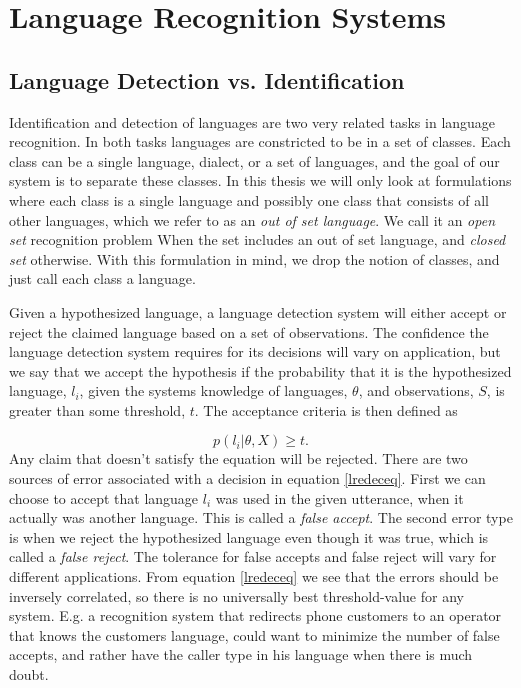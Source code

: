 \chapter{Language Recognition Systems}

\section{Language Detection vs. Identification}
\label{sect:detvsid}

Identification and detection of languages are two very related tasks in language recognition. In both tasks languages are constricted to be in a set of classes. Each class can be a single language, dialect, or a set of languages, and the goal of our system is to separate these classes. In this thesis we will only look at formulations where each class is a single language and possibly one class that consists of all other languages, which we refer to as an \emph{out of set language}. We call it an \emph{open set} recognition problem When the set includes an out of set language, and \emph{closed set} otherwise. With this formulation in mind, we drop the notion of classes, and just call each class a language. 

Given a hypothesized language, a language detection system will either accept or reject the claimed language based on a set of observations. The confidence the language detection system requires for its decisions will vary on application, but we say that we accept the hypothesis if the probability that it is the hypothesized language, $l_i$, given the systems knowledge of languages, $\theta$, and observations, $S$, is greater than some threshold, $t$. The acceptance criteria is then defined as

\begin{equation}
\label{lredeceq}
p(l_i | \theta, X) \geq t.
\end{equation}
Any claim that doesn't satisfy the equation will be rejected. There are two sources of error associated with a decision in equation \ref{lredeceq}. First we can choose to accept that language $l_i$ was used in the given utterance, when it actually was another language. This is called a \emph{false accept}. The second error type is when we reject the hypothesized language even though it  was true, which is called a  \emph{false reject}. The tolerance for false accepts and false reject will vary for different applications. From equation \ref{lredeceq} we see that the errors should be inversely correlated, so there is no universally best threshold-value for any system. E.g. a recognition system that redirects phone customers to an operator that knows the customers language, could want to minimize the number of false accepts, and rather have the caller type in his language when there is much doubt.

